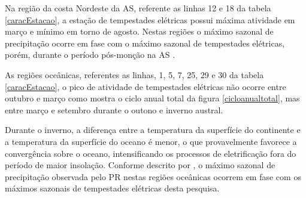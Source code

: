 


Na região da costa Nordeste da AS, referente as linhas 12 e 18 da tabela \ref{caracEstacao}, a estação de tempestades elétricas possui máxima atividade em março e mínimo em torno de agosto. Nestas regiões o máximo sazonal de precipitação ocorre em fase com o máximo sazonal de tempestades elétricas, porém, durante o período pós-monção na AS \cite{grimm2003nino,reboita2010regimes,shi-atlas,bombardi2008variabilidade,cusdodioTese}.

As regiões oceânicas, referentes as linhas, 1, 5, 7, 25, 29 e 30 da tabela \ref{caracEstacao}, o pico de atividade de tempestades elétricas não ocorre entre outubro e março como mostra o ciclo anual total da figura \ref{cicloanualtotal}, mas entre março e setembro durante o outono e inverno austral. 



 Durante o inverno, a diferença entre a temperatura da superfície do continente e a temperatura da superfície do oceano é menor, o que provavelmente favorece a convergência  sobre o oceano, intensificando os processos de eletrificação fora do período de maior insolação. Conforme descrito por , o máximo sazonal de precipitação observada pelo PR nestas regiões oceânicas ocorrem em fase com os máximos sazonais de tempestades elétricas desta pesquisa. 

